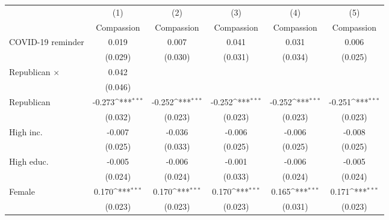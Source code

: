 {
\def\sym#1{\ifmmode^{#1}\else\(^{#1}\)\fi}
\begin{tabular}{l*{5}{c}}
\toprule
                    &\multicolumn{1}{c}{(1)}&\multicolumn{1}{c}{(2)}&\multicolumn{1}{c}{(3)}&\multicolumn{1}{c}{(4)}&\multicolumn{1}{c}{(5)}\\
                    &\multicolumn{1}{c}{Compassion}&\multicolumn{1}{c}{Compassion}&\multicolumn{1}{c}{Compassion}&\multicolumn{1}{c}{Compassion}&\multicolumn{1}{c}{Compassion}\\
\midrule
COVID-19 reminder   &       0.019         &       0.007         &       0.041         &       0.031         &       0.006         \\
                    &     (0.029)         &     (0.030)         &     (0.031)         &     (0.034)         &     (0.025)         \\
\addlinespace
Republican $\times$ &       0.042         &                     &                     &                     &                     \\
                    &     (0.046)         &                     &                     &                     &                     \\
\addlinespace
Republican          &      -0.273\sym{***}&      -0.252\sym{***}&      -0.252\sym{***}&      -0.252\sym{***}&      -0.251\sym{***}\\
                    &     (0.032)         &     (0.023)         &     (0.023)         &     (0.023)         &     (0.023)         \\
\addlinespace
High inc.           &      -0.007         &      -0.036         &      -0.006         &      -0.006         &      -0.008         \\
                    &     (0.025)         &     (0.033)         &     (0.025)         &     (0.025)         &     (0.025)         \\
\addlinespace
High educ.          &      -0.005         &      -0.006         &      -0.001         &      -0.006         &      -0.005         \\
                    &     (0.024)         &     (0.024)         &     (0.033)         &     (0.024)         &     (0.024)         \\
\addlinespace
Female              &       0.170\sym{***}&       0.170\sym{***}&       0.170\sym{***}&       0.165\sym{***}&       0.171\sym{***}\\
                    &     (0.023)         &     (0.023)         &     (0.023)         &     (0.031)         &     (0.023)         \\

\end{tabular}}
